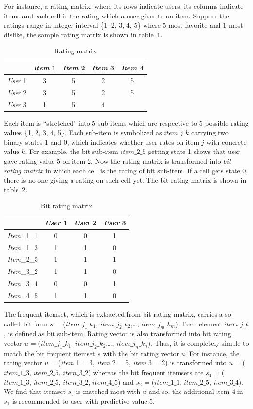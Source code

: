 \documentclass{sig-alternate}
\begin{document}
For instance, a rating matrix, where its rows indicate users, its columns indicate items and each cell is the rating which a user gives to an item. Suppose the ratings range in integer interval \{1, 2, 3, 4, 5\} where 5-most favorite and 1-most dislike, the sample rating matrix is shown in table~1.
\begin{table} \label{table:rating.matrix}
\centering
\caption{Rating matrix}
\begin{tabular}{|l|c|c|c|c|} \hline
&\textit{Item} 1&\textit{Item} 2&\textit{Item} 3&\textit{Item} 4\\ \hline
\textit{User} 1&3&5&2&5\\ \hline
\textit{User} 2&3&5&2&5\\ \hline
\textit{User} 3&1&5&4&\\ \hline
\end{tabular}
\end{table}
Each item is ``stretched" into 5 sub-items which are respective to 5 possible rating values \{1, 2, 3, 4, 5\}. Each sub-item is symbolized as $item\_j\_k$ carrying two binary-states 1 and 0, which indicates whether user rates on item $j$ with concrete value $k$. For example, the bit sub-item $item\_2\_5$ getting state 1 shows that user gave rating value 5 on item 2. Now the rating matrix is transformed into \textit{bit rating matrix} in which each cell is the rating of bit sub-item. If a cell gets state 0, there is no one giving a rating on such cell yet. The bit rating matrix is shown in table~2.
\begin{table} \label{table:bit.rating.matrix}
\centering
\caption{Bit rating matrix}
\begin{tabular}{|l|c|c|c|} \hline
&\textit{User} 1&\textit{User} 2&\textit{User} 3\\ \hline
\textit{Item}\_1\_1&0&0&1\\ \hline
\textit{Item}\_1\_3&1&1&0\\ \hline
\textit{Item}\_2\_5&1&1&1\\ \hline
\textit{Item}\_3\_2&1&1&0\\ \hline
\textit{Item}\_3\_4&0&0&1\\ \hline
\textit{Item}\_4\_5&1&1&0\\ \hline
\end{tabular}
\end{table}

The frequent itemset, which is extracted from bit rating matrix, carries a so-called bit form $s$ = ($item\_j_1\_k_1$, $item\_j_2\_k_2$,\ldots, $item\_j_m\_k_m$). Each element $item\_j\_k$, is defined as bit sub-item. Rating vector is also transformed into bit rating vector $u$ = ($item\_j_1\_k_1$, $item\_j_2\_k_2$,\ldots, $item\_j_n\_k_n$). Thus, it is completely simple to match the bit frequent itemset $s$ with the bit rating vector $u$. For instance, the rating vector $u$ = (\textit{item} 1 = 3, \textit{item} 2 = 5, \textit{item} 3 = 2) is transformed into $u$ = ($item\_1\_3$, $item\_2\_5$, $item\_3\_2$) whereas the bit frequent itemsets are $s_1$ = ($item\_1\_3$, $item\_2\_5$, $item\_3\_2$, $item\_4\_5$) and $s_2$ = ($item\_1\_1$, $item\_2\_5$, $item\_3\_4$). We find that itemset $s_1$ is matched most with $u$ and so, the additional item 4 in $s_1$ is recommended to user with predictive value 5.
\end{document}
